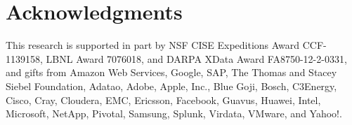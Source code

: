 \documentclass{sig-alternate}
\begin{document}
\section{Acknowledgments}
This research is supported in part by NSF CISE Expeditions Award CCF-1139158, LBNL Award 7076018, and DARPA XData Award FA8750-12-2-0331, and gifts from Amazon Web Services, Google, SAP,  The Thomas and Stacey Siebel Foundation, Adatao, Adobe, Apple, Inc., Blue Goji, Bosch, C3Energy, Cisco, Cray, Cloudera, EMC, Ericsson, Facebook, Guavus, Huawei, Intel, Microsoft, NetApp, Pivotal, Samsung, Splunk, Virdata, VMware, and Yahoo!. 

%

%
%



\balancecolumns

\end{document}
